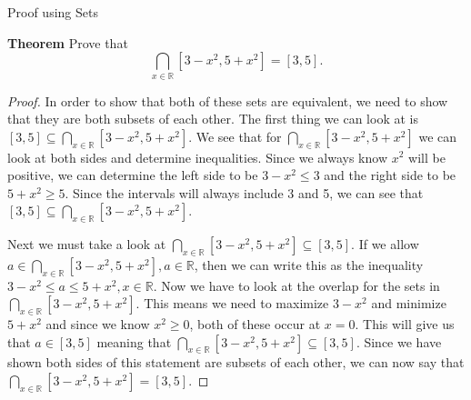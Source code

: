 Proof using Sets

\textbf{Theorem}
Prove that 
\[\bigcap_{x\in\mathbb{R}} [3-x^2,5+x^2]=[3,5].\]

\begin{proof}
In order to show that both of these sets are equivalent, we need to show that they are both subsets of each other. The first thing we can look at is $[3,5]\subseteq\bigcap_{x\in\mathbb{R}} [3-x^2,5+x^2]$. We see that for $\bigcap_{x\in\mathbb{R}} [3-x^2,5+x^2]$ we can look at both sides and determine inequalities. Since we always know $x^2$ will be positive, we can determine the left side to be $ 3 - x^2 \leq 3$ and the right side to be $5 + x^2 \geq 5$. Since the intervals will always include 3 and 5, we can see that $[3,5]\subseteq\bigcap_{x\in\mathbb{R}} [3-x^2,5+x^2]$. 

Next we must take a look at $\bigcap_{x\in\mathbb{R}} [3-x^2,5+x^2]\subseteq[3,5].$ If we allow $ a \in \bigcap_{x\in\mathbb{R}} [3-x^2,5+x^2], a \in \mathbb{R}$, then we can write this as the inequality $3 - x^2 \leq a \leq 5 + x^2, x \in \mathbb{R}$. Now we have to look at the overlap for the sets in $\bigcap_{x\in\mathbb{R}} [3-x^2,5+x^2]$. This means we need to maximize $3 - x^2$ and minimize $5 + x^2$ and since we know $x^2 \geq 0$, both of these occur at $x=0$. This will give us that $a \in [3,5]$ meaning that $\bigcap_{x\in\mathbb{R}} [3-x^2,5+x^2]\subseteq[3,5]$. Since we have shown both sides of this statement are subsets of each other, we can now say that $\bigcap_{x\in\mathbb{R}} [3-x^2,5+x^2]=[3,5].$
\end{proof}